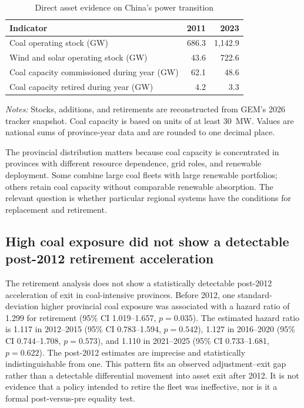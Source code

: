 \documentclass[11pt]{article}
\newcommand{\note}[1]{\begin{minipage}{0.96\textwidth}\footnotesize\textit{Notes:} #1\end{minipage}}
\begin{document}
\begin{table}[H]
\centering
\caption{Direct asset evidence on China's power transition}
\label{tab:assetfacts}
\begin{tabular}{lrr}
\toprule
Indicator & 2011 & 2023 \\
\midrule
Coal operating stock (GW) & 686.3 & 1,142.9 \\
Wind and solar operating stock (GW) & 43.6 & 722.6 \\
Coal capacity commissioned during year (GW) & 62.1 & 48.6 \\
Coal capacity retired during year (GW) & 4.2 & 3.3 \\
\bottomrule
\end{tabular}
\note{Stocks, additions, and retirements are reconstructed from GEM's 2026 tracker snapshot. Coal capacity is based on units of at least 30~MW. Values are national sums of province-year data and are rounded to one decimal place.}
\end{table}

The provincial distribution matters because coal capacity is concentrated in provinces with different resource dependence, grid roles, and renewable deployment. Some combine large coal fleets with large renewable portfolios; others retain coal capacity without comparable renewable absorption. The relevant question is whether particular regional systems have the conditions for replacement and retirement.

\subsection{High coal exposure did not show a detectable post-2012 retirement acceleration}

The retirement analysis does not show a statistically detectable post-2012 acceleration of exit in coal-intensive provinces. Before 2012, one standard-deviation higher provincial coal exposure was associated with a hazard ratio of 1.299 for retirement (95\% CI 1.019--1.657, $p=0.035$). The estimated hazard ratio is 1.117 in 2012--2015 (95\% CI 0.783--1.594, $p=0.542$), 1.127 in 2016--2020 (95\% CI 0.744--1.708, $p=0.573$), and 1.110 in 2021--2025 (95\% CI 0.733--1.681, $p=0.622$). The post-2012 estimates are imprecise and statistically indistinguishable from one. This pattern fits an observed adjustment--exit gap rather than a detectable differential movement into asset exit after 2012. It is not evidence that a policy intended to retire the fleet was ineffective, nor is it a formal post-versus-pre equality test.
\end{document}
